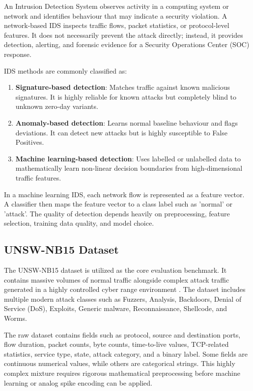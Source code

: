 \documentclass{ieeeaccess}
\begin{document}
An Intrusion Detection System observes activity in a computing system or network and identifies behaviour that may indicate a security violation. A network-based IDS inspects traffic flows, packet statistics, or protocol-level features. It does not necessarily prevent the attack directly; instead, it provides detection, alerting, and forensic evidence for a Security Operations Center (SOC) response.

IDS methods are commonly classified as:
\begin{enumerate}
\item \textbf{Signature-based detection}: Matches traffic against known malicious signatures. It is highly reliable for known attacks but completely blind to unknown zero-day variants.
\item \textbf{Anomaly-based detection}: Learns normal baseline behaviour and flags deviations. It can detect new attacks but is highly susceptible to False Positives.
\item \textbf{Machine learning-based detection}: Uses labelled or unlabelled data to mathematically learn non-linear decision boundaries from high-dimensional traffic features.
\end{enumerate}

In a machine learning IDS, each network flow is represented as a feature vector. A classifier then maps the feature vector to a class label such as 'normal' or 'attack'. The quality of detection depends heavily on preprocessing, feature selection, training data quality, and model choice.

\subsection{UNSW-NB15 Dataset}

The UNSW-NB15 dataset is utilized as the core evaluation benchmark. It contains massive volumes of normal traffic alongside complex attack traffic generated in a highly controlled cyber range environment \cite{Moustafa2015}. The dataset includes multiple modern attack classes such as Fuzzers, Analysis, Backdoors, Denial of Service (DoS), Exploits, Generic malware, Reconnaissance, Shellcode, and Worms.

The raw dataset contains fields such as protocol, source and destination ports, flow duration, packet counts, byte counts, time-to-live values, TCP-related statistics, service type, state, attack category, and a binary label. Some fields are continuous numerical values, while others are categorical strings. This highly complex mixture requires rigorous mathematical preprocessing before machine learning or analog spike encoding can be applied.
\end{document}
